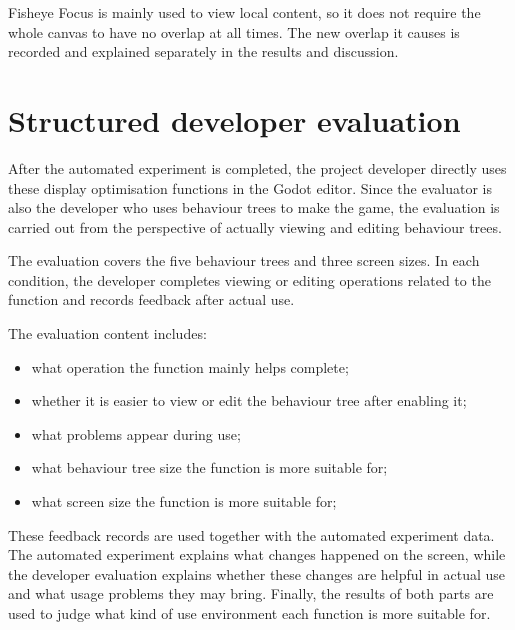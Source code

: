 Fisheye Focus is mainly used to view local content, so it does not require the whole canvas to have no overlap at all times. The new overlap it causes is recorded and explained separately in the results and discussion.

\section{Structured developer evaluation}

After the automated experiment is completed, the project developer directly uses these display optimisation functions in the Godot editor. Since the evaluator is also the developer who uses behaviour trees to make the game, the evaluation is carried out from the perspective of actually viewing and editing behaviour trees.

The evaluation covers the five behaviour trees and three screen sizes. In each condition, the developer completes viewing or editing operations related to the function and records feedback after actual use.

The evaluation content includes:

\begin{itemize}[leftmargin=*]
\item what operation the function mainly helps complete;
\end{itemize}

\begin{itemize}[leftmargin=*]
\item whether it is easier to view or edit the behaviour tree after enabling it;
\end{itemize}

\begin{itemize}[leftmargin=*]
\item what problems appear during use;
\end{itemize}

\begin{itemize}[leftmargin=*]
\item what behaviour tree size the function is more suitable for;
\end{itemize}

\begin{itemize}[leftmargin=*]
\item what screen size the function is more suitable for;
\end{itemize}

These feedback records are used together with the automated experiment data. The automated experiment explains what changes happened on the screen, while the developer evaluation explains whether these changes are helpful in actual use and what usage problems they may bring. Finally, the results of both parts are used to judge what kind of use environment each function is more suitable for.

